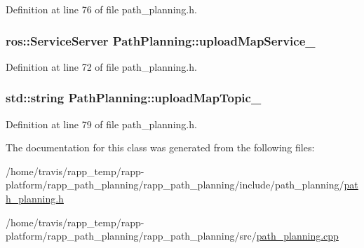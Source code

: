 Definition at line 76 of file path\-\_\-planning.\-h.

\hypertarget{classPathPlanning_a0932d5ff3842ada8e5b3ba8a621df551}{
\subsubsection[{upload\-Map\-Service\-\_\-}]{\setlength{\rightskip}{0pt plus 5cm}ros\-::\-Service\-Server Path\-Planning\-::upload\-Map\-Service\-\_\-\hspace{0.3cm}{\ttfamily [private]}}}\label{classPathPlanning_a0932d5ff3842ada8e5b3ba8a621df551}


Definition at line 72 of file path\-\_\-planning.\-h.

\hypertarget{classPathPlanning_a4a677303130f32e4f552f674b068a9b6}{
\subsubsection[{upload\-Map\-Topic\-\_\-}]{\setlength{\rightskip}{0pt plus 5cm}std\-::string Path\-Planning\-::upload\-Map\-Topic\-\_\-\hspace{0.3cm}{\ttfamily [private]}}}\label{classPathPlanning_a4a677303130f32e4f552f674b068a9b6}


Definition at line 79 of file path\-\_\-planning.\-h.



The documentation for this class was generated from the following files\-:\begin{DoxyCompactItemize}
\item 
/home/travis/rapp\-\_\-temp/rapp-\/platform/rapp\-\_\-path\-\_\-planning/rapp\-\_\-path\-\_\-planning/include/path\-\_\-planning/\hyperlink{path__planning_8h}{path\-\_\-planning.\-h}\item 
/home/travis/rapp\-\_\-temp/rapp-\/platform/rapp\-\_\-path\-\_\-planning/rapp\-\_\-path\-\_\-planning/src/\hyperlink{path__planning_8cpp}{path\-\_\-planning.\-cpp}\end{DoxyCompactItemize}
